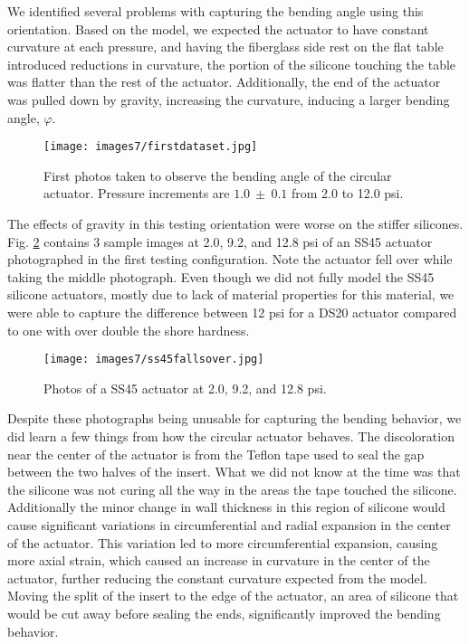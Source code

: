 We identified several problems with capturing the bending angle using this orientation. Based on the model, we expected the actuator to have constant curvature at each pressure, and having the fiberglass side rest on the flat table introduced reductions in curvature, the portion of the silicone touching the table was flatter than the rest of the actuator. Additionally, the end of the actuator was pulled down by gravity, increasing the curvature, inducing a larger bending angle, $\varphi$. 

\begin{figure}[h]
    \centering
     \texttt{[image: images7/firstdataset.jpg]}
    \caption{First photos taken to observe the bending angle of the circular actuator. Pressure increments are $1.0~\pm~0.1$ from 2.0 to 12.0 psi.}
    \label{fig:firstdataset}
\end{figure}

\clearpage

The effects of gravity in this testing orientation were worse on the stiffer silicones. Fig. \ref{fig:ss45fallsover} contains 3 sample images at 2.0, 9.2, and 12.8 psi of an SS45 actuator photographed in the first testing configuration. Note the actuator fell over while taking the middle photograph. Even though we did not fully model the SS45 silicone actuators, mostly due to lack of material properties for this material, we were able to capture the difference between 12 psi for a DS20 actuator compared to one with over double the shore hardness. 

\begin{figure}[h]
    \centering
     \texttt{[image: images7/ss45fallsover.jpg]}
    \caption{Photos of a SS45 actuator at 2.0, 9.2, and 12.8 psi.}
    \label{fig:ss45fallsover}
\end{figure}

Despite these photographs being unusable for capturing the bending behavior, we did learn a few things from how the circular actuator behaves. The discoloration near the center of the actuator is from the Teflon tape used to seal the gap between the two halves of the insert. What we did not know at the time was that the silicone was not curing all the way in the areas the tape touched the silicone. Additionally the minor change in wall thickness in this region of silicone would cause significant variations in circumferential and radial expansion in the center of the actuator. This variation led to more circumferential expansion, causing more axial strain, which caused an increase in curvature in the center of the actuator, further reducing the constant curvature expected from the model. Moving the split of the insert to the edge of the actuator, an area of silicone that would be cut away before sealing the ends, significantly improved the bending behavior. 

